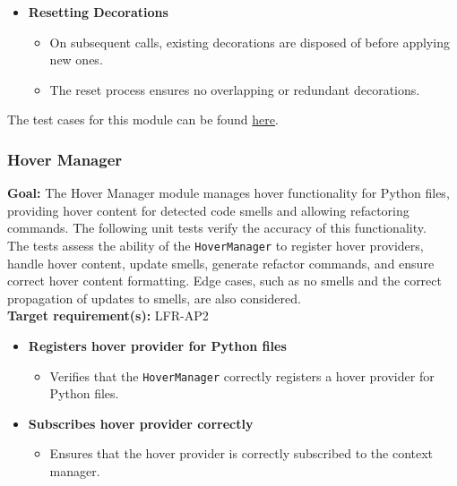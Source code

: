 \documentclass[12pt, titlepage]{article}
\begin{document}
\begin{enumerate}[label={\bf \textcolor{Maroon}{test-SRT-\arabic*}}, wide=0pt, font=\itshape]
\begin{itemize}
    \item \textbf{Resetting Decorations}
    \begin{itemize}
        \item On subsequent calls, existing decorations are disposed of before applying new ones.
        \item The reset process ensures no overlapping or redundant decorations.
    \end{itemize}
\end{itemize}

\noindent The test cases for this module can be found \href{https://github.com/ssm-lab/capstone--sco-vs-code-plugin/blob/plugin-multi-file/test/ui/fileHighlighter.test.ts}{here}.

\subsubsection{Hover Manager}

\textbf{Goal:} The Hover Manager module manages hover functionality for Python files, providing hover content for detected code smells and allowing refactoring commands. The following unit tests verify the accuracy of this functionality.\\

\noindent The tests assess the ability of the \texttt{HoverManager} to register hover providers, handle hover content, update smells, generate refactor commands, and ensure correct hover content formatting. Edge cases, such as no smells and the correct propagation of updates to smells, are also considered.\\

\noindent \textbf{Target requirement(s):} LFR-AP2~\cite{SRS} \\

\begin{itemize}
    \item \textbf{Registers hover provider for Python files}
    \begin{itemize}
        \item Verifies that the \texttt{HoverManager} correctly registers a hover provider for Python files.
    \end{itemize}

    \item \textbf{Subscribes hover provider correctly}
    \begin{itemize}
        \item Ensures that the hover provider is correctly subscribed to the context manager.
    \end{itemize}


\end{itemize}
\end{enumerate}
\end{document}
